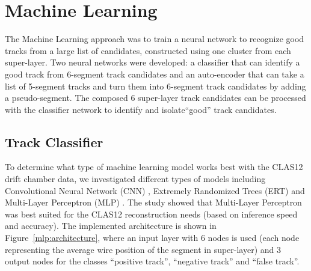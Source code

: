 \section{Machine Learning}

The Machine Learning approach was to train a neural network to recognize good tracks
 from a large list of candidates, constructed using one cluster from each super-layer.
 Two neural networks were developed: a classifier that can identify a good track from  6-segment
 track candidates  and an auto-encoder that can take a list of 5-segment tracks and turn them into 6-segment 
 track candidates by adding a pseudo-segment. The composed 6 super-layer track candidates 
 can be processed with the classifier network to identify and isolate``good'' track candidates.

 
 \subsection{Track Classifier}
 
 To determine what type of machine learning model works best with the CLAS12 drift chamber data, we investigated different 
 types of models  \cite{Gavalian:2020oxg} including Convolutional Neural Network (CNN) , Extremely Randomized Trees (ERT) \cite{scikitlearn-extratreesclassifier} and 
 Multi-Layer Perceptron (MLP) \cite{scikitlearn-mlpclassifier}. The study showed that Multi-Layer Perceptron was best suited for 
 the CLAS12 reconstruction needs (based on inference speed and accuracy). The implemented architecture is shown in 
 Figure~\ref{mlp:architecture}, where an input layer with 6 nodes is used (each node representing the average wire position 
 of the segment in super-layer) and 3 output nodes for the classes ``positive track'', ``negative track'' and ``false track''.
 

